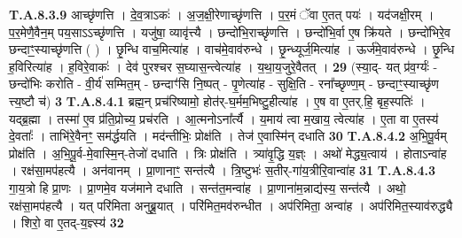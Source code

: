 \documentclass[17pt]{extarticle}
\begin{document}
                  \newline
                                                                  \textbf{ T.A.8.3.9} \newline
                  आच्छृ॑णत्ति । दे॒व॒त्राऽकः॑ । अ॒ज॒क्षी॒रेणाच्छृ॑णत्ति ।  प॒र॒मं ॅवा ए॒तत् पयः॑ । यद॑जक्षी॒रम् । प॒र॒मेणै॒वैन॒म् पय॒साऽऽच्छृ॑णत्ति ।  यजु॑षा॒ व्यावृ॑त्त्यै । छन्दो॑भि॒राच्छृ॑णत्ति । छन्दो॑भि॒र्वा ए॒ष क्रि॑यते । छन्दो॑भिरे॒व छन्दाꣳ॒॒स्याच्छृ॑णत्ति ( ) । छृ॒न्धि वाच॒मित्या॑ह ।  वाच॑मे॒वाव॑रुन्धे । छृ॒न्ध्यूर्ज॒मित्या॑ह । ऊर्ज॑मे॒वाव॑रुन्धे । छृ॒न्धि ह॒विरित्या॑ह । ह॒विरे॒वाकः॑ । देव॑ पुरश्चर स॒घ्यास॒न्त्वेत्या॑ह ।  य॒था॒य॒जुरे॒वैतत् । \textbf{ 29} \newline
                  \newline
                                                        (स्या॒द्- यत् प्र॑व॒र्ग्यः॑ - छन्दो॑भिः करोति - वी॒र्य॑ सम्मित॒म् - छन्दाꣳ॑सि नि॒ष्पत् - पृ॒णेत्या॑ह - सुक्षि॒ति - रना᳚च्छृण्ण॒म् - छन्दाꣳ॒॒स्याच्छृ॑ण त्त्य॒ष्टौ च॑) \textbf{3} \newline \newline
                                \textbf{ T.A.8.4.1} \newline
                  ब्रह्म॒न् प्रच॑रिष्यामो॒ होत॑र्-घ॒र्मम॒भिष्टु॒हीत्या॑ह ।  ए॒ष वा ए॒तर्.हि॒ बृह॒स्पतिः॑ । यद्ब्र॒ह्मा ।  तस्मा॑ ए॒व प्र॑ति॒प्रोच्य॒ प्रच॑रति ।  आ॒त्मनोऽना᳚र्त्यै । य॒माय॑ त्वा म॒खाय॒ त्वेत्या॑ह ।  ए॒ता वा ए॒तस्य॑ दे॒वताः᳚ । ताभि॑रे॒वैनꣳ॒॒ सम॑र्द्धयति । मद॑न्तीभिः॒ प्रोक्ष॑ति । तेज॑ ए॒वास्मि॑न् दधाति \textbf{ 30} \newline
                  \newline
                                                                  \textbf{ T.A.8.4.2} \newline
                  अ॒भि॒पू॒र्वम् प्रोक्ष॑ति । अ॒भि॒पू॒र्व-मे॒वास्मि॒न्-तेजो॑ दधाति । त्रिः प्रोक्ष॑ति । त्र्या॑वृ॒द्धि य॒ज्ञ्ः । अथो॑ मेद्ध्य॒त्वाय॑ । होताऽन्वा॑ह । रक्ष॑सा॒मप॑हत्यै । अन॑वानम् । प्रा॒णानाꣳ॒॒ सन्त॑त्यै ।  त्रि॒ष्टुभः॑ स॒तीर्-गा॑य॒त्रीरि॒वान्वा॑ह \textbf{ 31} \newline
                  \newline
                                                                  \textbf{ T.A.8.4.3} \newline
                  गा॒य॒त्रो हि प्रा॒णः । प्रा॒णमे॒व यज॑माने दधाति । सन्त॑त॒मन्वा॑ह । प्रा॒णाना॑म॒न्नाद्य॑स्य॒ सन्त॑त्यै । अथो॒ रक्ष॑सा॒मप॑हत्यै । यत् परि॑मिता अनुब्रू॒यात् । परि॑मित॒मव॑रुन्धीत । अप॑रिमिता॒ अन्वा॑ह ।  अप॑रिमित॒स्याव॑रुद्ध्यै । शिरो॒ वा ए॒तद्-य॒ज्ञ्स्य॑ \textbf{ 32} \newline
\end{document}
